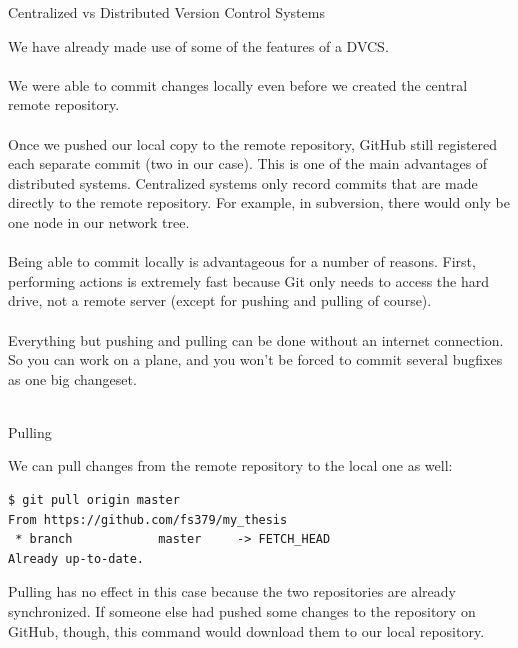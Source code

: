 \documentclass[10pt]{beamer}
\begin{document}
\begin{frame}[fragile]{Centralized vs Distributed Version Control Systems}

We have already made use of some of the features of a DVCS.\\~\\

We were able to commit changes locally even before we created the central remote repository.\\~\\

Once we pushed our local copy to the remote repository, GitHub still registered each separate commit (two in our case). This is one of the main advantages of distributed systems. Centralized systems only record commits that are made directly to the remote repository. For example, in subversion, there would only be one node in our network tree.\\~\\

Being able to commit locally is advantageous for a number of reasons. First, performing actions is extremely fast because Git only needs to access the hard drive, not a remote server (except for pushing and pulling of course).\\~\\

Everything but pushing and pulling can be done without an internet connection. So you can work on a plane, and you won't be forced to commit several bugfixes as one big changeset.\\~\\


\end{frame}

\begin{frame}[fragile]{Pulling}


We can pull changes from the remote repository to the local one as well:

\begin{lstlisting}
$ git pull origin master
From https://github.com/fs379/my_thesis
 * branch            master     -> FETCH_HEAD
Already up-to-date.
\end{lstlisting}
Pulling has no effect in this case because the two repositories are already synchronized. If someone else had pushed some changes to the repository on GitHub, though, this command would download them to our local repository.\\

\end{frame}
\end{document}
